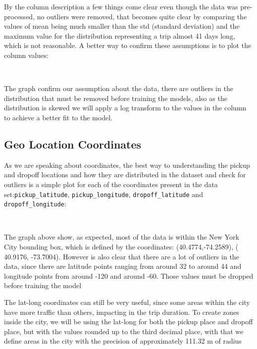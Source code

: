 \documentclass[11pt]{article}
\begin{document}
By the column description a few things come clear even though the data was pre-processed, no outliers were removed, that becomes quite clear by comparing the values of mean being much smaller than the std (standard deviation) and the maximum value for the distribution representing a trip almost 41 days long, which is not reasonable. A better way to confirm these assumptions is to plot the column values:

    \begin{center}
    \end{center}
    { \hspace*{\fill} \\}
    
The graph confirm our assumption about the data, there are outliers in the distribution that must be removed before training the models, also as the distribution is skewed we will apply a log transform to the values in the column to achieve a better fit to the model.
\subsection{Geo Location Coordinates}

\hspace{0.5cm}As we are speaking about coordinates, the best way to understanding the pickup and dropoff locations and how they are distributed in the dataset and check for outliers is a simple plot for each of the coordinates present in the data set:\texttt{pickup\_latitude}, \texttt{pickup\_longitude}, \texttt{dropoff\_latitude} and \texttt{dropoff\_longitude}:

    \begin{center}
    \end{center}
    { \hspace*{\fill} \\}
    
The graph above show, as expected, most of the data is within the New York City bounding box, which is defined by the coordinates: (40.4774,-74.2589), ( 40.9176, -73.7004). However is also clear that there are a lot of outliers in the data, since there are latitude points ranging from around 32 to around 44 and longitude points from around -120 and around -60. Those values must be dropped before training the model

The lat-long coordinates can still be very useful, since some areas within the city have more traffic than others, impacting in the trip duration. To create zones inside the city, we will be using the lat-long for both the pickup place and dropoff place, but with the values rounded up to the third decimal place, with that we define areas in the city with the precision of approximately 111.32 m of radius \cite{lat_long_round_radius}
    
\end{document}
